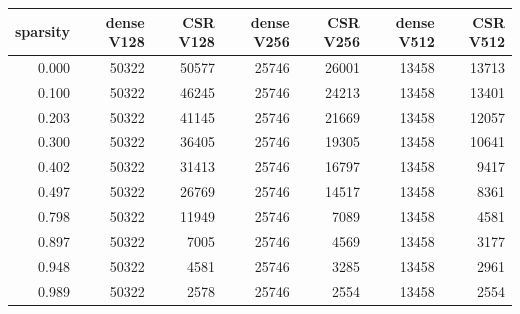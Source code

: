 \begin{tabular}{rrrrrrr}
\toprule
sparsity & dense V128 & CSR V128 & dense V256 & CSR V256 & dense V512 & CSR V512 \\
\midrule
0.000 & 50322 & 50577 & 25746 & 26001 & 13458 & 13713 \\
0.100 & 50322 & 46245 & 25746 & 24213 & 13458 & 13401 \\
0.203 & 50322 & 41145 & 25746 & 21669 & 13458 & 12057 \\
0.300 & 50322 & 36405 & 25746 & 19305 & 13458 & 10641 \\
0.402 & 50322 & 31413 & 25746 & 16797 & 13458 & 9417 \\
0.497 & 50322 & 26769 & 25746 & 14517 & 13458 & 8361 \\
0.798 & 50322 & 11949 & 25746 & 7089 & 13458 & 4581 \\
0.897 & 50322 & 7005 & 25746 & 4569 & 13458 & 3177 \\
0.948 & 50322 & 4581 & 25746 & 3285 & 13458 & 2961 \\
0.989 & 50322 & 2578 & 25746 & 2554 & 13458 & 2554 \\
\bottomrule
\end{tabular}
